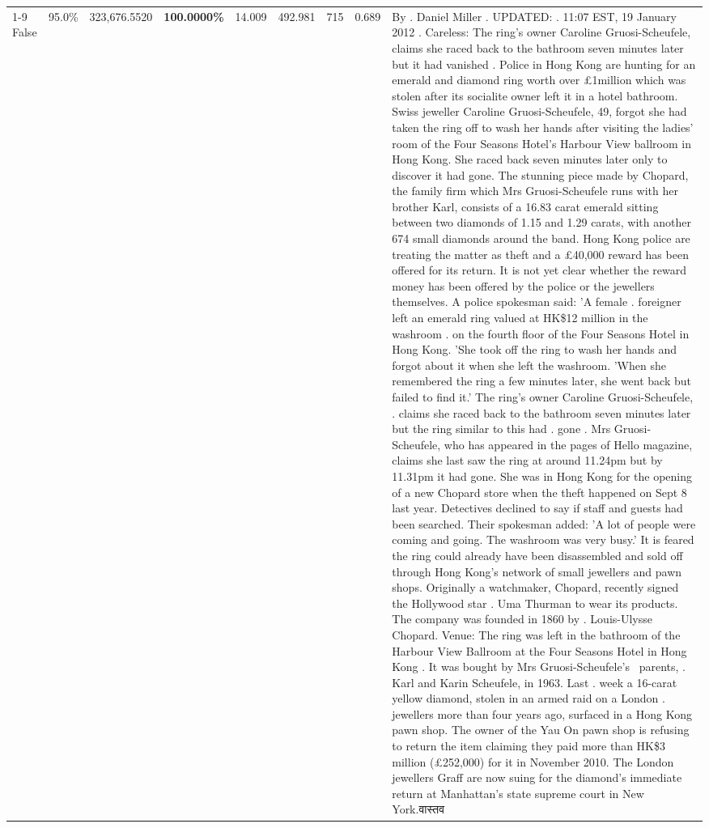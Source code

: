 \begin{table}[H]
\begin{tabular}{lllrlllll}
\cline{1-9}
False & 95.0\% & 323,676.5520 & \bfseries \color{red} 100.0000\% & 14.009 & 492.981 & 715 & 0.689 & By . Daniel Miller . UPDATED: . 11:07 EST, 19 January 2012 . Careless: The ring's owner Caroline Gruosi-Scheufele, claims she raced back to the bathroom seven minutes later but it had vanished . Police in Hong Kong are hunting for an emerald and diamond ring worth over £1million which was stolen after its socialite owner left it in a hotel bathroom. Swiss jeweller Caroline Gruosi-Scheufele, 49, forgot she had taken the ring off to wash her hands after visiting the ladies' room of the Four Seasons Hotel's Harbour View ballroom in Hong Kong. She raced back seven minutes later only to discover it had gone. The stunning piece made by Chopard, the family firm which Mrs Gruosi-Scheufele runs with her brother Karl, consists of a 16.83 carat emerald sitting between two diamonds of 1.15 and 1.29 carats, with another 674 small diamonds around the band. Hong Kong police are treating the matter as theft and a £40,000 reward has been offered for its return. It is not yet clear whether the reward money has been offered by the police or the jewellers themselves. A police spokesman said: 'A female . foreigner left an emerald ring valued at HK\$12 million in the washroom . on the fourth floor of the Four Seasons Hotel in Hong Kong. 'She took off the ring to wash her hands and forgot about it when she left the washroom. 'When she remembered the ring a few minutes later, she went back but failed to find it.' The ring's owner Caroline Gruosi-Scheufele, . claims she raced back to the bathroom seven minutes later but the ring similar to this had . gone . Mrs Gruosi-Scheufele, who has appeared in the pages of Hello magazine, claims she last saw the ring at around 11.24pm but by 11.31pm it had gone. She was in Hong Kong for the opening of a new Chopard store when the theft happened on Sept 8 last year. Detectives declined to say if staff and guests had been searched. Their spokesman added: 'A lot of people were coming and going. The washroom was very busy.' It is feared the ring could already have been disassembled and sold off through Hong Kong's network of small jewellers and pawn shops. Originally a watchmaker, Chopard, recently signed the Hollywood star . Uma Thurman to wear its products. The company was founded in 1860 by . Louis-Ulysse Chopard. Venue: The ring was left in the bathroom of the Harbour View Ballroom at the Four Seasons Hotel in Hong Kong . It was bought by Mrs Gruosi-Scheufele's  parents, . Karl and Karin Scheufele, in 1963. Last . week a 16-carat yellow diamond, stolen in an armed raid on a London . jewellers more than four years ago, surfaced in a Hong Kong pawn shop. The owner of the Yau On pawn shop is refusing to return the item claiming they paid more than HK\$3 million (£252,000) for it in November 2010. The London jewellers Graff are now suing for the diamond’s immediate return at Manhattan’s state supreme court in New York.वास्तव \\

\end{tabular}
\end{table}
